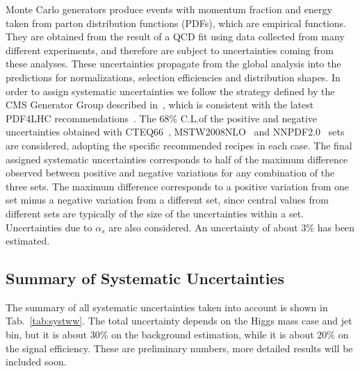 Monte Carlo generators produce events with momentum fraction and energy taken 
from parton distribution functions (PDFs), which are empirical functions. They 
are obtained from the result of a QCD fit using data collected from many 
different experiments, and therefore are subject to uncertainties coming from 
these analyses. These uncertainties propagate from the global analysis 
into the predictions for normalizations, selection efficiencies and 
distribution shapes. In order to assign systematic uncertainties we follow the 
strategy defined by the CMS Generator Group described in~\cite{XS}, which is 
consistent with the latest PDF4LHC recommendations~\cite{PDF4LHC}. The 68\% 
C.L.of the positive and negative uncertainties obtained with 
CTEQ66~\cite{Nadolsky:2008zw}, MSTW2008NLO~\cite{Martin:2009iq} and 
NNPDF2.0~\cite{Ball:2010de} sets are considered, adopting the specific 
recommended recipes in each case. The final assigned systematic uncertainties 
corresponds to half of the maximum difference observed between positive and 
negative variations for any combination of the three sets. The maximum 
difference corresponds to a positive variation from one set minus a negative 
variation from a different set, since central values from different sets are 
typically of the size of the uncertainties within a set. Uncertainties due 
to $\alpha_s$ are also considered. An uncertainty of about 3\% has been 
estimated.

\subsection{Summary of Systematic Uncertainties}
The summary of all systematic uncertainties taken into account 
is shown in Tab.~\ref{tab:systww}. The total 
uncertainty depends on the Higgs mass case and jet bin, but it is about 30\% on the 
background estimation, while it is about 20\% on the signal efficiency. These are 
preliminary numbers, more detailed results will be included soon.


